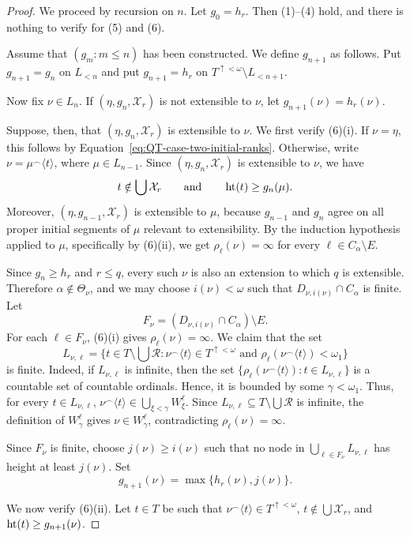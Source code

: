 \begin{proof}
  We proceed by recursion on $n$.
Let $g_0=h_r$.  Then (1)--(4) hold, and there is nothing to verify for
(5) and (6).

Assume that $(g_m:m\leq n)$ has been constructed.  We define $g_{n+1}$ as
follows.  Put $g_{n+1}=g_n$ on $L_{<n}$ and put
$g_{n+1}=h_r$ on $T^{\uparrow<\omega}\setminus L_{<n+1}$.

Now fix $\nu\in L_n$.  If $(\eta,g_n,\mathcal X_r)$ is not extensible to
$\nu$, let $g_{n+1}(\nu)=h_r(\nu)$.

Suppose, then, that $(\eta,g_n,\mathcal X_r)$ is extensible to $\nu$.
We first verify (6)(i).  If $\nu=\eta$, this follows by Equation~\eqref{eq:QT-case-two-initial-ranks}.  Otherwise,
write $\nu=\mu^\frown\langle t\rangle$, where $\mu\in L_{n-1}$.  Since
$(\eta,g_n,\mathcal X_r)$ is extensible to $\nu$, we have
\[
  t\notin\bigcup\mathcal X_r
  \qquad\text{and}\qquad
  \operatorname{ht}(t)\geq g_n(\mu).
\]
Moreover, $(\eta,g_{n-1},\mathcal X_r)$ is extensible to $\mu$, because
$g_{n-1}$ and $g_n$ agree on all proper initial segments of $\mu$ relevant
to extensibility.  By the induction hypothesis applied to $\mu$, specifically by (6)(ii), we get $\rho_\ell(\nu)=\infty$ for every $\ell\in C_\alpha\setminus E$.

Since $g_n\geq h_r$ and $r\leq q$, every such $\nu$ is also an extension to
which $q$ is extensible.  Therefore $\alpha\notin\Theta_\nu$, and we may
choose $i(\nu)<\omega$ such that $D_{\nu,i(\nu)}\cap C_\alpha$ is finite.
Let
\[
  F_\nu=(D_{\nu,i(\nu)}\cap C_\alpha)\setminus E.
\]
For each $\ell\in F_\nu$, (6)(i) gives $\rho_\ell(\nu)=\infty$.
We claim that the set
\[
  L_{\nu,\ell}=
  \{t\in T\setminus\bigcup\mathcal R:
    \nu^\frown\langle t\rangle\in T^{\uparrow<\omega}
    \text{ and }
    \rho_\ell(\nu^\frown\langle t\rangle)<\omega_1\}
\]
is finite.
Indeed, if $L_{\nu,\ell}$ is infinite, then the set $\{\rho_\ell(\nu^\frown\langle t\rangle):t\in L_{\nu,\ell}\}$
is a countable set of countable ordinals.
Hence, it is bounded by some $\gamma<\omega_1$.  Thus, for every $t\in L_{\nu,\ell}$, $\nu^\frown\langle t\rangle\in\bigcup_{\xi<\gamma}W^\ell_\xi$.
Since $L_{\nu,\ell}\subseteq T\setminus\bigcup\mathcal R$ is infinite, the definition of $W^\ell_\gamma$ gives $\nu\in W^\ell_\gamma$, contradicting $\rho_\ell(\nu)=\infty$.

Since $F_\nu$ is finite, choose $j(\nu)\geq i(\nu)$ such that no node in
$\bigcup_{\ell\in F_\nu}L_{\nu,\ell}$ has height at least $j(\nu)$.  Set
\[
  g_{n+1}(\nu)=\max\{h_r(\nu),j(\nu)\}.
\]

We now verify (6)(ii).
Let $t\in T$ be such that $\nu^\frown\langle t\rangle\in T^{\uparrow<\omega}$, $t\notin\bigcup\mathcal X_r$, and $\operatorname{ht}(t)\geq g_{n+1}(\nu)$.


\end{proof}
